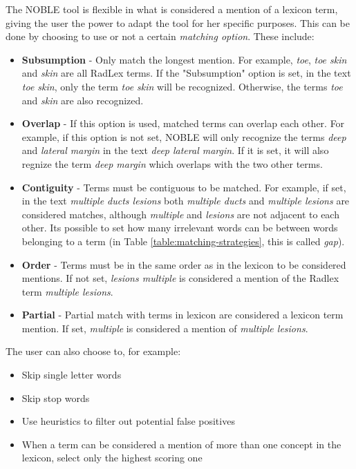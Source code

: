 The NOBLE tool is flexible in what is considered a mention of a lexicon term, giving the user the power to adapt the tool for her specific purposes. This can be done by choosing to use or not a certain \textit{matching option}. These include:

\begin{itemize}

\item \textbf{Subsumption} - Only match the longest mention. For example, \textit{toe}, \textit{toe skin} and \textit{skin} are all RadLex terms. If the "Subsumption" option is set, in the text \textit{toe skin}, only the term \textit{toe skin} will be recognized. Otherwise, the terms \textit{toe} and \textit{skin} are also recognized.

\item \textbf{Overlap} - If this option is used, matched terms can overlap each other. For example, if this option is not set, NOBLE will only recognize the terms \textit{deep} and \textit{lateral margin} in the text \textit{deep lateral margin}. If it is set, it will also regnize the term \textit{deep margin} which overlaps with the two other terms.

\item \textbf{Contiguity} - Terms must be contiguous to be matched. For example, if set, in the text \textit{multiple ducts lesions} both \textit{multiple ducts} and \textit{multiple lesions} are considered matches, although \textit{multiple} and \textit{lesions} are not adjacent to each other. Its possible to set how many irrelevant words can be between words belonging to a term (in Table \ref{table:matching-strategies}, this is called \textit{gap}).

\item \textbf{Order} - Terms must be in the same order as in the lexicon to be considered mentions. If not set, \textit{lesions multiple} is considered a mention of the Radlex term \textit{multiple lesions}.

\item \textbf{Partial} - Partial match with terms in lexicon are considered a lexicon term mention. If set, \textit{multiple} is considered a mention of \textit{multiple lesions}.

\end{itemize}

The user can also choose to, for example:

\begin{itemize}
\item Skip single letter words
\item Skip stop words
\item Use heuristics to filter out potential false positives
\item When a term can be considered a mention of more than one concept in the lexicon,  select only the highest scoring one
\end{itemize}

